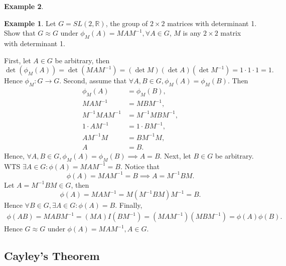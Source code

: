 \documentclass{article}
\newtheorem{theorem}{Theorem}[section]
\theoremstyle{definition}
\newtheorem{example}{Example}[section]
\begin{document}
\begin{example}
    \begin{example}
        Let $G = SL(2,\mathbb{R})$, the group of $2 \times 2$ matrices with determinant 1. Show that $G \approx G$ under $\phi_M(A) = MAM^{-1}, \forall A \in G$, $M$ is any $2 \times 2$ matrix with determinant 1. 
        
        First, let $A \in G$ be arbitrary, then
        \begin{equation*}
            \det(\phi_M(A)) = \det(MAM^{-1}) = (\det M)(\det A)(\det M^{-1}) = 1\cdot 1 \cdot 1 = 1.
        \end{equation*}
        Hence $\phi_M: G \to G$. Second, assume that $\forall A,B \in G, \phi_M(A) = \phi_M(B)$. Then
        \begin{align*}
            \phi_M(A) &= \phi_M(B), \\
            MAM^{-1} &= MBM^{-1}, \\
            M^{-1}MAM^{-1} &= M^{-1}MBM^{-1}, \\
            1 \cdot AM^{-1} &= 1 \cdot BM^{-1}, \\
            AM^{-1}M &= BM^{-1}M, \\
            A &= B.
        \end{align*}
        Hence, $\forall A,B \in G, \phi_M(A) = \phi_M(B) \implies A = B$. Next, let $B \in G$ be arbitrary. WTS $\exists A \in G: \phi(A) = MAM^{-1} = B$. Notice that
        \begin{equation*}
            \phi(A) = MAM^{-1} = B \implies A = M^{-1}BM.
        \end{equation*}
        Let $A = M^{-1}BM \in G$, then
        \begin{equation*}
            \phi(A) = MAM^{-1} = M(M^{-1}BM)M^{-1} = B.
        \end{equation*}
        Hence $\forall B \in G, \exists A \in G: \phi(A)=B$. Finally, 
        \begin{align*}
            \phi(AB) = MABM^{-1} = (MA)I(BM^{-1}) = (MAM^{-1})(MBM^{-1}) = \phi(A)\phi(B).
        \end{align*}
        Hence $G \approx G$ under $\phi(A) = MAM^{-1}, A \in G$.
    \end{example}
 \end{example}
 
 \subsection{Cayley's Theorem}
 
\end{document}

